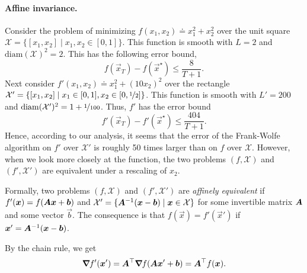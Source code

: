 \paragraph{Affine invariance.}

Consider the problem of minimizing $f(x_1, x_2) \doteq x_1^2 + x_2^2$ over the unit square
$\mathcal{X} = \{ [x_1,x_2] \mid x_1, x_2 \in [0,1] \}$. This function is smooth with $L=2$ and
$\mathrm{diam}(\mathcal{X})^2 = 2$. This has the following error bound, \[
    f(\vec{x}_T) - f(\vec{x}^\star) \leq \frac{8}{T+1}.
\]
Next consider $f'(x_1, x_2) \doteq x_1^2 + (10x_2)^2$ over the rectangle $\mathcal{X}' = \{ [x_1,
            x_2] \mid x_1 \in [0,1], x_2 \in [0, \nicefrac{1}{2}] \}$. This function is smooth with $L' = 200$
and $\mathrm{diam}(\mathcal{X}')^2 = 1 + \nicefrac{1}{100}$. Thus, $f'$ has the error bound \[
    f'(\vec{x}_T) - f'(\vec{x}^\star) \leq \frac{404}{T+1}.
\]
Hence, according to our analysis, it seems that the error of the Frank-Wolfe algorithm on $f'$ over
$\mathcal{X}'$ is roughly 50 times larger than on $f$ over $\mathcal{X}$. However, when we look
more closely at the function, the two problems $(f,\mathcal{X})$ and $(f',\mathcal{X}')$ are
equivalent under a rescaling of $x_2$.

Formally, two problems $(f, \mathcal{X})$ and $(f', \mathcal{X}')$ are \textit{affinely equivalent}
if $f'(\bm{x}) = f(\bm{A} \bm{x} + \bm{b})$ and $\mathcal{X}' = \{ \bm{A}^{-1}(\bm{x} -
    \bm{b}) \mid \bm{x} \in \mathcal{X} \}$ for some invertible matrix $\bm{A}$ and some vector
$\vec{b}$. The consequence is that $f(\vec{x}) = f'(\vec{x}')$ if $\bm{x}' = \bm{A}^{-1}
    (\bm{x} - \bm{b})$.

By the chain rule, we get \[
    \bm{\nabla}_{\! } f'(\bm{x}') = \bm{A}^\top \bm{\nabla}_{\! } f(\bm{A} \bm{x}' + \bm{b}) = \bm{A}^\top f(\bm{x}).
\]

